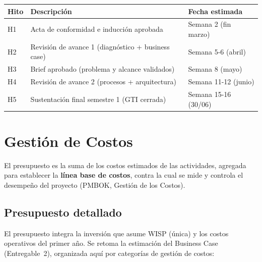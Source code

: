 \begin{center}
\label{tab:hitos}
\begin{tabularx}{\textwidth}{C{1cm} X L{4cm}}
\toprule
\textbf{Hito} & \textbf{Descripción} & \textbf{Fecha estimada} \\
\midrule
H1 & Acta de conformidad e inducción aprobada & Semana 2 (fin marzo) \\
H2 & Revisión de avance 1 (diagnóstico + business case) & Semana 5-6 (abril) \\
H3 & Brief aprobado (problema y alcance validados) & Semana 8 (mayo) \\
H4 & Revisión de avance 2 (procesos + arquitectura) & Semana 11-12 (junio) \\
H5 & Sustentación final semestre 1 (GTI cerrada) & Semana 15-16 (30/06) \\
\bottomrule
\end{tabularx}
\end{center}

\section{Gestión de Costos}
\label{sec:costos-plan}

El presupuesto es la suma de los costos estimados de las actividades, agregada para
establecer la \textbf{línea base de costos}, contra la cual se mide y controla el
desempeño del proyecto (PMBOK, Gestión de los Costos).

\subsection{Presupuesto detallado}

El presupuesto integra la inversión que asume WISP (única) y los costos operativos del
primer año. Se retoma la estimación del Business Case (Entregable~2), organizada aquí
por categorías de gestión de costos:

